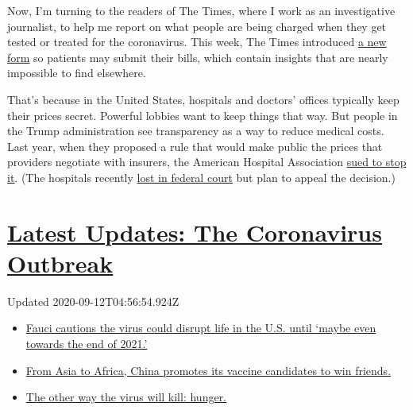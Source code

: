 Now, I'm turning to the readers of The Times, where I work as an
investigative journalist, to help me report on what people are being
charged when they get tested or treated for the coronavirus. This week,
The Times introduced
\href{http://www.nytimes3xbfgragh.onion/costofcare}{a new form} so
patients may submit their bills, which contain insights that are nearly
impossible to find elsewhere.

That's because in the United States, hospitals and doctors' offices
typically keep their prices secret. Powerful lobbies want to keep things
that way. But people in the Trump administration see transparency as a
way to reduce medical costs. Last year, when they proposed a rule that
would make public the prices that providers negotiate with insurers, the
American Hospital Association
\href{https://www.nytimes3xbfgragh.onion/2019/12/04/health/hospitals-trump-prices-transparency.html}{sued
to stop it}. (The hospitals recently
\href{https://www.nytimes3xbfgragh.onion/2020/06/23/upshot/hospitals-lost-price-transparency-lawsuit.html}{lost
in federal court} but plan to appeal the decision.)

\hypertarget{latest-updates-the-coronavirus-outbreak}{%
\section{\texorpdfstring{\href{https://www.nytimes3xbfgragh.onion/2020/09/11/world/covid-19-coronavirus.html?action=click\&pgtype=Article\&state=default\&region=MAIN_CONTENT_1\&context=storylines_live_updates}{Latest
Updates: The Coronavirus
Outbreak}}{Latest Updates: The Coronavirus Outbreak}}\label{latest-updates-the-coronavirus-outbreak}}

Updated 2020-09-12T04:56:54.924Z

\begin{itemize}
\tightlist
\item
  \href{https://www.nytimes3xbfgragh.onion/2020/09/11/world/covid-19-coronavirus.html?action=click\&pgtype=Article\&state=default\&region=MAIN_CONTENT_1\&context=storylines_live_updates\#link-dfb8a16}{Fauci
  cautions the virus could disrupt life in the U.S. until `maybe even
  towards the end of 2021.'}
\item
  \href{https://www.nytimes3xbfgragh.onion/2020/09/11/world/covid-19-coronavirus.html?action=click\&pgtype=Article\&state=default\&region=MAIN_CONTENT_1\&context=storylines_live_updates\#link-7104d154}{From
  Asia to Africa, China promotes its vaccine candidates to win friends.}
\item
  \href{https://www.nytimes3xbfgragh.onion/2020/09/11/world/covid-19-coronavirus.html?action=click\&pgtype=Article\&state=default\&region=MAIN_CONTENT_1\&context=storylines_live_updates\#link-393ad215}{The
  other way the virus will kill: hunger.}
\end{itemize}

